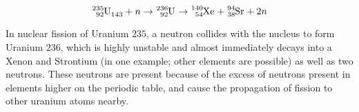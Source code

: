 \documentclass[12pt]{report}
\begin{document}
\begin{flushleft}
\[\tensor*[^{235}_{92}]{\mathrm{U}}{_{143}} + n \rightarrow
\tensor*[^{236}_{92}]{\mathrm{U}}{} \rightarrow
\tensor*[^{140}_{54}]{\mathrm{Xe}}{} + \tensor*[^{94}_{38}]{\mathrm{Sr}}{}
+ 2n\]

In nuclear fission of Uranium \(235\), a neutron collides with the nucleus
to form Uranium \(236\), which is highly unstable and almost immediately
decays into a Xenon and Strontium (in one example; other elements are possible)
as well as two neutrons. These neutrons are present because of the excess of
neutrons present in elements higher on the periodic table, and cause the
propagation of fission to other uranium atoms nearby.

\end{flushleft}
\end{document}
